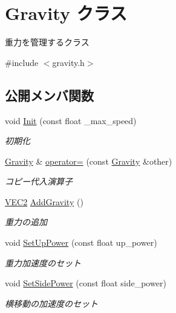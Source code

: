 \hypertarget{class_gravity}{}\section{Gravity クラス}
\label{class_gravity}


重力を管理するクラス  




{\ttfamily \#include $<$gravity.\+h$>$}

\subsection*{公開メンバ関数}
\begin{DoxyCompactItemize}
\item 
void \mbox{\hyperlink{class_gravity_acd4190d806a404342bbb49031e47b7b6}{Init}} (const float \+\_\+max\+\_\+speed)
\begin{DoxyCompactList}\small\item\em 初期化 \end{DoxyCompactList}\item 
\mbox{\hyperlink{class_gravity}{Gravity}} \& \mbox{\hyperlink{class_gravity_a68162c6452cad9eef17c6688266023c0}{operator=}} (const \mbox{\hyperlink{class_gravity}{Gravity}} \&other)
\begin{DoxyCompactList}\small\item\em コピー代入演算子 \end{DoxyCompactList}\item 
\mbox{\hyperlink{common_8h_afb0c5e21d4133ff4f200992c0b534e1b}{V\+E\+C2}} \mbox{\hyperlink{class_gravity_a310540f600900ee0b93f7e84dd2f2b26}{Add\+Gravity}} ()
\begin{DoxyCompactList}\small\item\em 重力の追加 \end{DoxyCompactList}\item 
void \mbox{\hyperlink{class_gravity_af31f3dceee7c82385b4c93569e215f91}{Set\+Up\+Power}} (const float up\+\_\+power)
\begin{DoxyCompactList}\small\item\em 重力加速度のセット \end{DoxyCompactList}\item 
void \mbox{\hyperlink{class_gravity_a76503b3788b696748828f6e48556b9ab}{Set\+Side\+Power}} (const float side\+\_\+power)
\begin{DoxyCompactList}\small\item\em 横移動の加速度のセット \end{DoxyCompactList}\item 

\end{DoxyCompactItemize}
